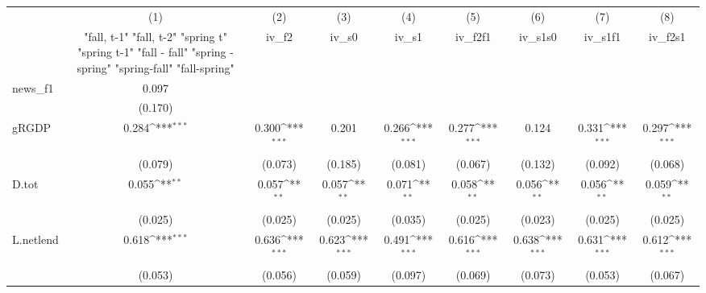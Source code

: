 {
\def\sym#1{\ifmmode^{#1}\else\(^{#1}\)\fi}
\begin{tabular}{l*{8}{c}}
\toprule
            &\multicolumn{1}{c}{(1)}&\multicolumn{1}{c}{(2)}&\multicolumn{1}{c}{(3)}&\multicolumn{1}{c}{(4)}&\multicolumn{1}{c}{(5)}&\multicolumn{1}{c}{(6)}&\multicolumn{1}{c}{(7)}&\multicolumn{1}{c}{(8)}\\
            &\multicolumn{1}{c}{  "fall, t-1" "fall, t-2" "spring t" "spring t-1"  "fall - fall" "spring - spring" "spring-fall" "fall-spring" }&\multicolumn{1}{c}{iv\_f2}&\multicolumn{1}{c}{iv\_s0}&\multicolumn{1}{c}{iv\_s1}&\multicolumn{1}{c}{iv\_f2f1}&\multicolumn{1}{c}{iv\_s1s0}&\multicolumn{1}{c}{iv\_s1f1}&\multicolumn{1}{c}{iv\_f2s1}\\
\midrule
news\_f1     &       0.097         &                     &                     &                     &                     &                     &                     &                     \\
            &     (0.170)         &                     &                     &                     &                     &                     &                     &                     \\
\addlinespace
gRGDP       &       0.284\sym{***}&       0.300\sym{***}&       0.201         &       0.266\sym{***}&       0.277\sym{***}&       0.124         &       0.331\sym{***}&       0.297\sym{***}\\
            &     (0.079)         &     (0.073)         &     (0.185)         &     (0.081)         &     (0.067)         &     (0.132)         &     (0.092)         &     (0.068)         \\
\addlinespace
D.tot       &       0.055\sym{**} &       0.057\sym{**} &       0.057\sym{**} &       0.071\sym{**} &       0.058\sym{**} &       0.056\sym{**} &       0.056\sym{**} &       0.059\sym{**} \\
            &     (0.025)         &     (0.025)         &     (0.025)         &     (0.035)         &     (0.025)         &     (0.023)         &     (0.025)         &     (0.025)         \\
\addlinespace
L.netlend   &       0.618\sym{***}&       0.636\sym{***}&       0.623\sym{***}&       0.491\sym{***}&       0.616\sym{***}&       0.638\sym{***}&       0.631\sym{***}&       0.612\sym{***}\\
            &     (0.053)         &     (0.056)         &     (0.059)         &     (0.097)         &     (0.069)         &     (0.073)         &     (0.053)         &     (0.067)         \\

\end{tabular}}

